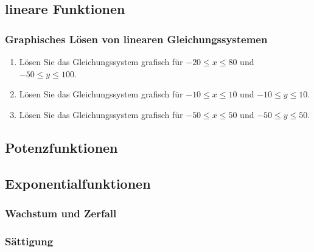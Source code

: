 \setcounter{aufgabenNummer}{1}
  \renewcommand{\kAufgabenBuchstabe}{F}

\subsection{lineare Funktionen}


  \subsubsection{Graphisches Lösen von linearen Gleichungssystemen}

  \begin{enumerate}
  \item Lösen Sie das Gleichungssystem grafisch für
    $-20 \leq x \leq 80$ und $-50 \leq y \leq 100$.
    \item Lösen Sie das Gleichungssystem grafisch für
      $-10 \leq x \leq 10$ und $-10 \leq y \leq 10$.
          \item Lösen Sie das Gleichungssystem grafisch für
      $-50 \leq x \leq 50$ und $-50 \leq y \leq 50$.
  \end{enumerate}




\subsection{Potenzfunktionen}

\subsection{Exponentialfunktionen}

\subsubsection{Wachstum und Zerfall}

\subsubsection{Sättigung}
\newpage
